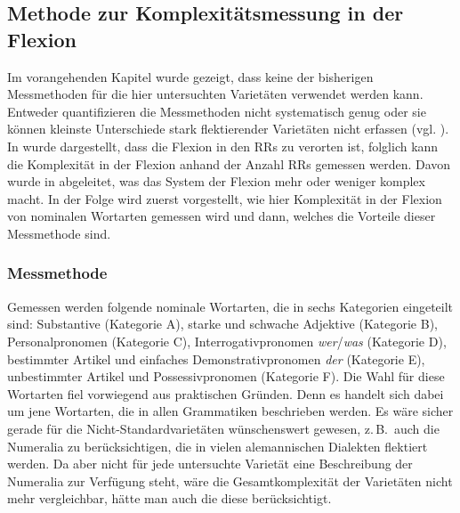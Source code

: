 \begin{exe}
\begin{exe}
\subsection{Methode zur Komplexitätsmessung in der Flexion}\label{4.3.2}

Im vorangehenden Kapitel wurde gezeigt, dass keine der bisherigen Messmethoden für die hier untersuchten Varietäten verwendet werden kann. Entweder quantifizieren die Messmethoden nicht systematisch genug oder sie können kleinste Unterschiede stark flektierender Varietäten nicht erfassen (vgl. ). In  wurde dargestellt, dass die Flexion in den RRs zu verorten ist, folglich kann die Komplexität in der Flexion anhand der Anzahl RRs gemessen werden. Davon wurde in  abgeleitet, was das System der Flexion mehr oder weniger komplex macht. In der Folge wird zuerst vorgestellt, wie hier Komplexität in der Flexion von nominalen Wortarten gemessen wird und dann, welches die Vorteile dieser Messmethode sind.

\subsubsection{Messmethode} Gemessen werden folgende nominale Wortarten, die in sechs Kategorien eingeteilt sind: Substantive (Kategorie A), starke und schwache Adjektive (Kategorie B), Personalpronomen (Kategorie C), Interrogativpronomen \textit{wer}/\textit{was} (Kategorie D), bestimmter Artikel und einfaches Demonstrativpronomen \textit{der} (Kategorie E), unbestimmter Artikel und Possessivpronomen (Kategorie F). Die Wahl für diese Wortarten fiel vorwiegend aus praktischen Gründen. Denn es handelt sich dabei um jene Wortarten, die in allen Grammatiken beschrieben werden. Es wäre sicher gerade für die Nicht-Stan\-dard\-va\-ri\-e\-tä\-ten wünschenswert gewesen, z.\,B.\ auch die Numeralia zu berücksichtigen, die in vielen alemannischen Dialekten flektiert werden. Da aber nicht für jede untersuchte Varietät eine Beschreibung der Numeralia zur Verfügung steht, wäre die Gesamtkomplexität der Varietäten nicht mehr vergleichbar, hätte man auch die diese berücksichtigt.


\end{exe}
\end{exe}
